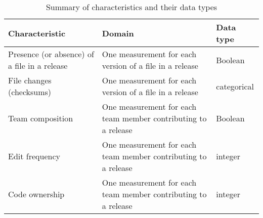 \begin{table}[H]
\caption{Summary of characteristics and their data types}
\label{table:ch3_characteristics} 
\centering
\begin{tabu} to 
  \toprule
  Characteristic & Domain & Data type \\
  \midrule
  Presence (or absence) of a file in a release &
  One measurement for each version of a file in a release &
  Boolean \\
  \midrule
  File changes (checksums) &
  One measurement for each version of a file in a release &
  categorical \\
  \midrule
  Team composition &
  One measurement for each team member contributing to a release &
  Boolean \\
  \midrule
  Edit frequency &
  One measurement for each team member contributing to a release &
  integer \\
  \midrule
  Code ownership &
  One measurement for each team member contributing to a release &
  integer \\
\bottomrule
\end{tabu}
\end{table}
